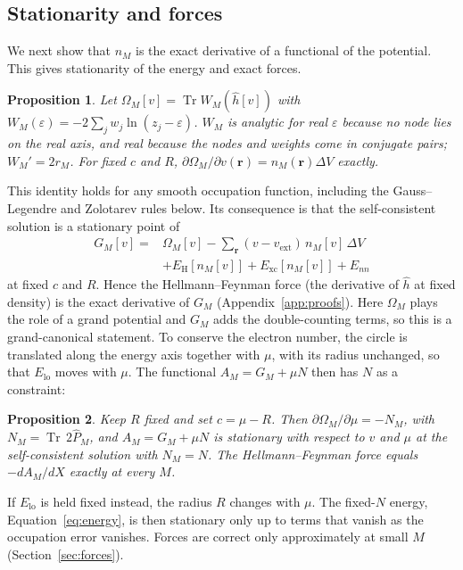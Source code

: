 \documentclass[aps,prb,twocolumn,superscriptaddress,floatfix,longbibliography]{revtex4-2}
\newtheorem{proposition}{Proposition}
\theoremstyle{remark}
\newcommand{\Tr}{\operatorname{Tr}}
\begin{document}
\subsection{Stationarity and forces}\label{sec:var}

We next show that $n_M$ is the exact derivative of a functional of the potential. This gives stationarity of the energy
and exact forces.

\begin{proposition}\label{prop:var}
Let $\Omega_M[v]=\Tr W_M(\hat h[v])$ with $W_M(\varepsilon)=-2\sum_jw_j\ln(z_j-\varepsilon)$. $W_M$ is analytic for real
$\varepsilon$ because no node lies on the real axis, and real because the nodes and weights come in conjugate pairs;
$W_M'=2r_M$. For fixed $c$ and $R$, $\partial\Omega_M/\partial v(\bm r)=n_M(\bm r)\Delta V$ exactly.
\end{proposition}

This identity holds for any smooth occupation function, including the Gauss--Legendre and Zolotarev rules below. Its
consequence is that the self-consistent solution is a stationary point of
\begin{align}
G_M[v]={}&\Omega_M[v]-\textstyle\sum_{\bm r}(v-v_\mathrm{ext})\,n_M[v]\,\Delta V\nonumber\\
&+E_\mathrm{H}[n_M[v]]+E_\mathrm{xc}[n_M[v]]+E_{nn}
\label{eq:GM}
\end{align}
at fixed $c$ and $R$. Hence the Hellmann--Feynman force (the derivative of $\hat h$ at fixed density) is the exact derivative
of $G_M$ (Appendix~\ref{app:proofs}).
Here $\Omega_M$ plays the role of a grand potential and $G_M$ adds the double-counting terms, so this is a grand-canonical
statement. To conserve the electron number, the circle is translated along the energy axis together with $\mu$, with its radius
unchanged, so that $E_\mathrm{lo}$ moves with $\mu$. The functional $A_M=G_M+\mu N$ then has $N$ as a constraint:

\begin{proposition}\label{prop:rigid}
Keep $R$ fixed and set $c=\mu-R$. Then $\partial\Omega_M/\partial\mu=-N_M$, with $N_M=\Tr\,2\hat P_M$, and
$A_M=G_M+\mu N$ is stationary with respect to $v$ and $\mu$ at the self-consistent solution with $N_M=N$. The
Hellmann--Feynman force equals $-dA_M/dX$ exactly at every $M$.
\end{proposition}

If $E_\mathrm{lo}$ is held fixed instead, the radius $R$ changes with $\mu$. The fixed-$N$ energy,
Equation~\eqref{eq:energy}, is then stationary only up to terms that vanish as the occupation error vanishes. Forces are
correct only approximately at small $M$ (Section~\ref{sec:forces}).
\end{document}
